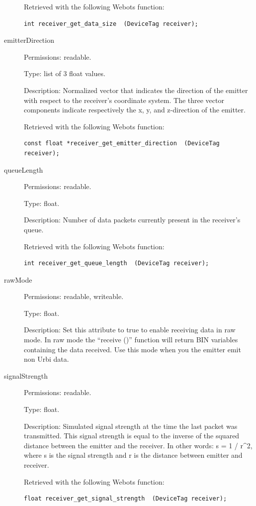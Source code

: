 \begin{description}
          Retrieved with the following Webots function:


\begin{lstlisting}
int receiver_get_data_size  (DeviceTag receiver);
\end{lstlisting}
\item[{         emitterDirection
 }]            Permissions: readable.


 Type: list of 3 float values.


 Description: Normalized vector that indicates the direction of the
 emitter with respect to the receiver's coordinate system. The three
 vector components indicate respectively the x, y, and z-{}direction
 of the emitter.


          Retrieved with the following Webots function:


\begin{lstlisting}
const float *receiver_get_emitter_direction  (DeviceTag receiver);
\end{lstlisting}
\item[{         queueLength
 }]            Permissions: readable.


 Type: float.


 Description: Number of data packets currently present in the
 receiver's queue.


          Retrieved with the following Webots function:


\begin{lstlisting}
int receiver_get_queue_length  (DeviceTag receiver);
\end{lstlisting}
\item[{         rawMode
 }]            Permissions: readable, writeable.


 Type: float.


 Description: Set this attribute to true to enable receiving data in
 raw mode.  In raw mode the ``receive ()'' function will return BIN
 variables containing the data received. Use this mode when you the
 emitter emit non Urbi data.

\item[{         signalStrength
 }]            Permissions: readable.


 Type: float.


 Description: Simulated signal strength at the time the last packet
 was transmitted.  This signal strength is equal to the inverse of the
 squared distance between the emitter and the receiver. In other
 words: s = 1 / r\^{}2, where s is the signal strength and r is the
 distance between emitter and receiver.


          Retrieved with the following Webots function:


\begin{lstlisting}
float receiver_get_signal_strength  (DeviceTag receiver);
\end{lstlisting}
\end{description}

